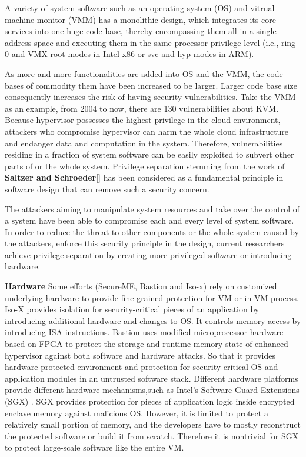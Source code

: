 \documentclass[conference]{IEEEtran}
\begin{document}
A variety of system software such as an operating system (OS) and vitrual machine monitor (VMM) has a monolithic design, which integrates its core services into one huge code base, thereby encompassing them all in a single address space and executing them in the same processor privilege level (i.e., ring 0 and VMX-root modes in Intel x86 or svc and hyp modes in ARM). 

As more and more functionalities are added into OS and the VMM, the code bases of commodity them have been increased to be larger. Larger code base  size consequently increases the risk of having security vulnerabilities. 
Take the VMM as an example, from 2004 to now, there are 130 vulnerabilities about KVM.
 Because hypervisor possesses the highest privilege in the cloud environment, attackers who compromise hypervisor can harm the whole cloud infrastructure and endanger data and computation in the system.
Therefore, vulnerabilities residing in a fraction of system software can be easily exploited to subvert other parts of or the whole system.
Privilege separation stemming from the work of \textbf{Saltzer and Schroeder}\ref{} has been considered as a fundamental principle in software design that can remove such a security concern.


The attackers aiming to manipulate system resources and take over the control of a system have been able to compromise each and every level of system software.
In order to reduce the threat to other components or the whole system caused by the attackers, enforce this security principle in the design, current researchers achieve privilege separation by creating more privileged software or introducing hardware.

\textbf{Hardware}
Some efforts (SecureME\cite{Chhabra2011SecureME}, Bastion\cite{Champagne2010Scalable} and Iso-x\cite{Evtyushkin2015Iso}) rely on 
customized underlying hardware to provide fine-grained protection for VM or in-VM process. 
Iso-X provides isolation for security-critical pieces of an application by introducing additional hardware and changes to OS. It controls memory access by introducing ISA instructions. 
Bastion uses modified microprocessor hardware based on FPGA to protect the storage and runtime memory state of enhanced hypervisor against both software and hardware attacks. So that it provides hardware-protected environment and protection for security-critical OS and application modules in an untrusted software stack.
Different hardware platforms provide different hardware mechanisms,such as Intel's Software Guard Extensions (SGX) \cite{WuLLCZG18}. 
SGX provides protection for pieces of application logic inside encrypted enclave memory against malicious OS. However, it is limited to protect a relatively small portion
of memory, and the developers have to mostly reconstruct the protected software or build it from scratch. Therefore it is nontrivial for SGX to protect large-scale software like the entire VM. 
\end{document}
